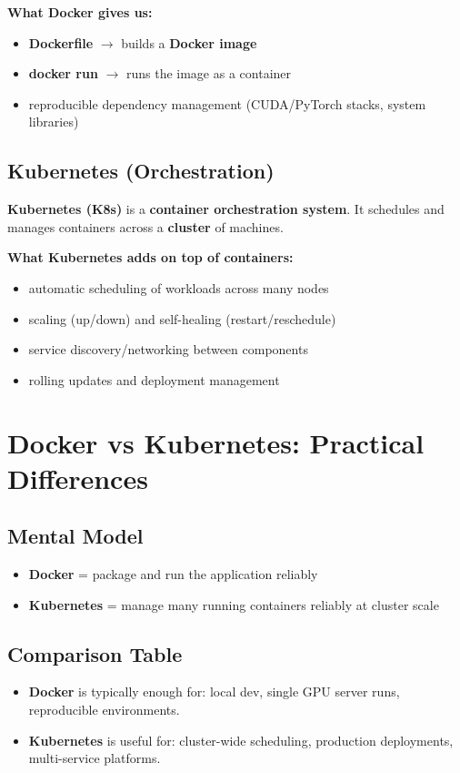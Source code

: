 \documentclass[11pt]{article}
\begin{document}
\textbf{What Docker gives us:}
\begin{itemize}
  \item \textbf{Dockerfile} $\rightarrow$ builds a \textbf{Docker image}
  \item \textbf{docker run} $\rightarrow$ runs the image as a container
  \item reproducible dependency management (CUDA/PyTorch stacks, system libraries)
\end{itemize}

\subsection{Kubernetes (Orchestration)}
\textbf{Kubernetes (K8s)} is a \textbf{container orchestration system}. It schedules and manages containers across a \textbf{cluster} of machines.

\textbf{What Kubernetes adds on top of containers:}
\begin{itemize}
  \item automatic scheduling of workloads across many nodes
  \item scaling (up/down) and self-healing (restart/reschedule)
  \item service discovery/networking between components
  \item rolling updates and deployment management
\end{itemize}

\section{Docker vs Kubernetes: Practical Differences}

\subsection{Mental Model}
\begin{itemize}
  \item \textbf{Docker} = package and run the application reliably
  \item \textbf{Kubernetes} = manage many running containers reliably at cluster scale
\end{itemize}

\subsection{Comparison Table}
\begin{itemize}
  \item \textbf{Docker} is typically enough for: local dev, single GPU server runs, reproducible environments.
  \item \textbf{Kubernetes} is useful for: cluster-wide scheduling, production deployments, multi-service platforms.
\end{itemize}
\end{document}
